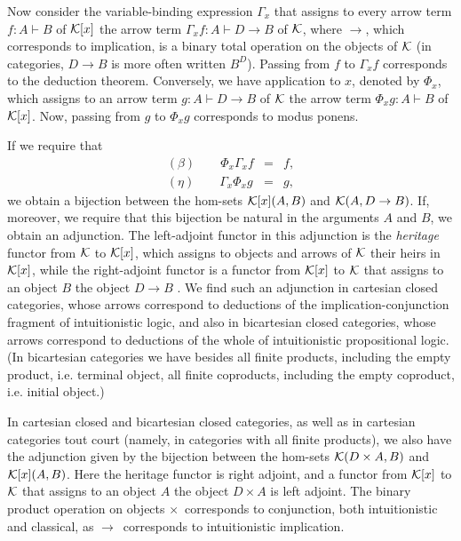 Now consider the variable-binding expression $\Gamma _{x}$ that assigns to
every arrow term $f:A\vdash B$ of ${\cal K}[x]$ the arrow term $\Gamma
_{x}f:A\vdash D\rightarrow B$ of ${\cal K}$, where $\rightarrow $, which
corresponds to implication, is a binary total operation on the objects of $%
{\cal K}$ (in categories, $D\rightarrow B$ is more often written $B^{D}$).
Passing from $f$ to $\Gamma _{x}f$ corresponds to the deduction theorem.
Conversely, we have application to $x$, denoted by $\Phi _{x}$, which
assigns to an arrow term $g:A\vdash D\rightarrow B$ of ${\cal K}$ the arrow
term $\Phi _{x}g:A\vdash B$ of ${\cal K}[x]$. Now, passing from $g$ to $\Phi
_{x}g$ corresponds to modus ponens.

If we require that 
\begin{eqnarray*}
(\beta )\qquad \Phi _{x}\Gamma _{x}f &=&f, \\
(\eta )\qquad \Gamma _{x}\Phi _{x}g &=&g,
\end{eqnarray*}
we obtain a bijection between the hom-sets ${\cal K}[x](A,B)$ and ${\cal K}%
(A,D\rightarrow B)$. If, moreover, we require that this bijection be natural
in the arguments $A$ and $B$, we obtain an adjunction. The left-adjoint
functor in this adjunction is the {\it heritage} functor from ${\cal K}$ to $%
{\cal K}[x]$, which assigns to objects and arrows of ${\cal K}$ their heirs
in ${\cal K}[x]$, while the right-adjoint functor is a functor from ${\cal K}%
[x]$ to ${\cal K}$ that assigns to an object $B$ the object $D\rightarrow B$%
. We find such an adjunction in cartesian closed categories, whose arrows
correspond to deductions of the implication-conjunction fragment of
intuitionistic logic, and also in bicartesian closed categories, whose
arrows correspond to deductions of the whole of intuitionistic propositional
logic. (In bicartesian categories we have besides all finite products,
including the empty product, i.e. terminal object, all finite coproducts,
including the empty coproduct, i.e. initial object.)

In cartesian closed and bicartesian closed categories, as well as in
cartesian categories tout court (namely, in categories with all finite
products), we also have the adjunction given by the bijection between the
hom-sets ${\cal K}(D\times A,B)$ and ${\cal K}[x](A,B)$. Here the heritage
functor is right adjoint, and a functor from ${\cal K}[x]$ to ${\cal K}$
that assigns to an object $A$ the object $D\times A$ is left adjoint. The
binary product operation on objects $\times $\ corresponds to conjunction,
both intuitionistic and classical, as $\rightarrow $\ corresponds to
intuitionistic implication.

